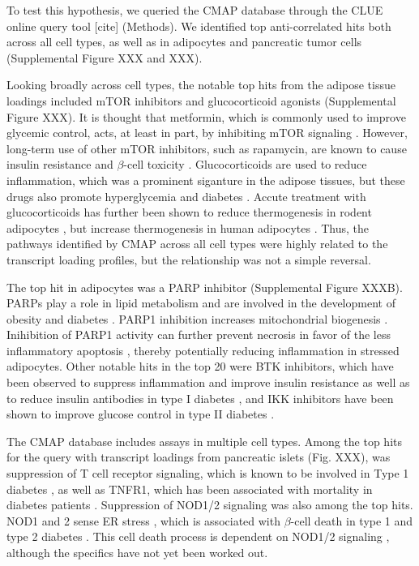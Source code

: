 \documentclass[
]{article}
\begin{document}
To test this hypothesis, we queried the CMAP database through the CLUE
online query tool {[}cite{]} (Methods). We identified top
anti-correlated hits both across all cell types, as well as in
adipocytes and pancreatic tumor cells (Supplemental Figure XXX and XXX).

Looking broadly across cell types, the notable top hits from the adipose
tissue loadings included mTOR inhibitors and glucocorticoid agonists
(Supplemental Figure XXX). It is thought that metformin, which is
commonly used to improve glycemic control, acts, at least in part, by
inhibiting mTOR signaling \cite{pmid30290005, 
pmid30034573}. However, long-term use of other mTOR inhibitors, such as
rapamycin, are known to cause insulin resistance and \(\beta\)-cell
toxicity \cite{pmid30034573, pmid23881200, pmid21266327}.
Glucocorticoids are used to reduce inflammation, which was a prominent
siganture in the adipose tissues, but these drugs also promote
hyperglycemia and diabetes \cite{pmid24582093, pmid35585199}. Accute
treatment with glucocorticoids has further been shown to reduce
thermogenesis in rodent adipocytes \cite{pmid30310815, pmid11254472, 
pmid23197361}, but increase thermogenesis in human adipocytes
\cite{pmid27411014, pmid25385872}. Thus, the pathways identified by CMAP
across all cell types were highly related to the transcript loading
profiles, but the relationship was not a simple reversal.

The top hit in adipocytes was a PARP inhibitor (Supplemental Figure
XXXB). PARPs play a role in lipid metabolism and are involved in the
development of obesity and diabetes \cite{pmid34450194}. PARP1
inhibition increases mitochondrial biogenesis \cite{pmid21459330}.
Inihibition of PARP1 activity can further prevent necrosis in favor of
the less inflammatory apoptosis \cite{pmid12114611}, thereby potentially
reducing inflammation in stressed adipocytes. Other notable hits in the
top 20 were BTK inhibitors, which have been observed to suppress
inflammation and improve insulin resistance \cite{pmid33648925} as well
as to reduce insulin antibodies in type I diabetes \cite{pmid28753229},
and IKK inhibitors have been shown to improve glucose control in type II
diabetes \cite{pmid28683283, pmid15685170}.

The CMAP database includes assays in multiple cell types. Among the top
hits for the query with transcript loadings from pancreatic islets (Fig.
XXX), was suppression of T cell receptor signaling, which is known to be
involved in Type 1 diabetes \cite{pmid33603744}, as well as TNFR1, which
has been associated with mortality in diabetes patients
\cite{pmid32281000}. Suppression of NOD1/2 signaling was also among the
top hits. NOD1 and 2 sense ER stress \cite{pmid27007849, pmid28823510},
which is associated with \(\beta\)-cell death in type 1 and type 2
diabetes \cite{pmid24520198}. This cell death process is dependent on
NOD1/2 signaling \cite{pmid27007849}, although the specifics have not
yet been worked out.
\end{document}
